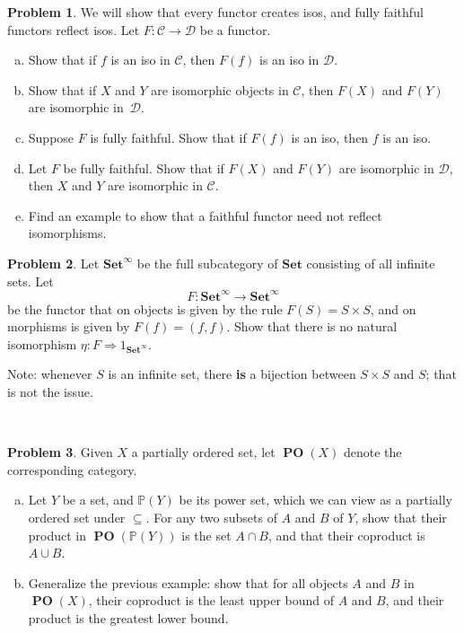\documentclass[11pt]{article}
\DeclareMathOperator{\PO}{\mathbf{PO}}
\newcommand{\Set}{\mathbf{Set}}
\theoremstyle{definition}
\newtheorem{problem}{Problem}
\begin{document}
\begin{problem}
We will show that every functor creates isos, and fully faithful functors reflect isos. Let $F\!: \mathscr{C} \to \mathscr{D}$ be a functor.
\begin{enumerate}[a)]
	\item Show that if $f$ is an iso in $\mathscr{C}$, then $F(f)$ is an iso in $\mathscr{D}$.
	\item Show that if $X$ and $Y$ are isomorphic objects in $\mathscr{C}$, then $F(X)$ and $F(Y)$ are isomorphic in~$\mathscr{D}$.
	\item Suppose $F$ is fully faithful. Show that if $F(f)$ is an iso, then $f$ is an iso.
	\item Let $F$ be fully faithful. Show that if $F(X)$ and $F(Y)$ are isomorphic in $\mathscr{D}$, then $X$ and $Y$ are isomorphic in $\mathscr{C}$.
	\item Find an example to show that a faithful functor need not reflect isomorphisms.
\end{enumerate}
\end{problem}

\vfill

\newpage

\begin{problem}
Let $\Set^\infty$ be the full subcategory of $\Set$ consisting of all infinite sets. Let 
$$F\!:\Set^\infty \to \Set^\infty$$ 
be the functor that on objects is given by the rule $F(S)=S\times S$, and on morphisms is given by $F(f)=(f,f)$. Show that there is no natural isomorphism $\eta: F\Rightarrow 1_{\Set^{\infty}}$.

\vspace{0.5em}

\noindent
Note: whenever $S$ is an infinite set, there {\bf is} a bijection between $S \times S$ and $S$; that is not the issue.
\end{problem}

\



\begin{problem}
Given $X$ a partially ordered set, let {\bf $\PO(X)$} denote the corresponding category. 
\begin{enumerate}[a)]
	\item Let $Y$ be a set, and $\mathbb{P}(Y)$ be its power set, which we can view as a partially ordered set under $\subseteq$. For any two subsets of $A$ and $B$ of $Y$, show that their product in $\PO(\mathbb{P}(Y))$ is the set $A \cap B$, and that their coproduct is $A \cup B$.
	\item Generalize the previous example: show that for all objects $A$ and $B$ in {\bf $\PO(X)$}, their coproduct is the least upper bound of $A$ and $B$, and their product is the greatest lower bound.
\end{enumerate}
\end{problem}
\end{document}
